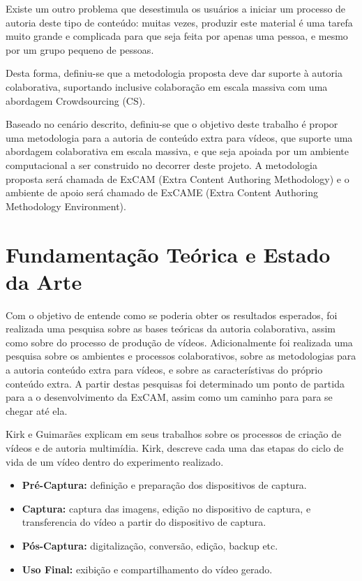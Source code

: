 \documentclass{sig-alternate}
\begin{document}
Existe um outro problema que desestimula os usuários a iniciar um processo de autoria deste tipo de conteúdo: muitas vezes, produzir este material é uma tarefa muito grande e complicada para que seja feita por apenas uma pessoa, e mesmo por um grupo pequeno de pessoas. 

Desta forma, definiu-se que a metodologia proposta deve dar suporte à autoria colaborativa, suportando inclusive colaboração em escala massiva\cite{TEDMassive} com uma abordagem Crowdsourcing (CS).

Baseado no cenário descrito, definiu-se que o objetivo deste trabalho é propor uma metodologia para a autoria de conteúdo extra para vídeos, que suporte uma abordagem colaborativa em escala massiva, e que seja apoiada por um ambiente computacional a ser construido no decorrer deste projeto. A metodologia proposta será chamada de ExCAM (Extra Content Authoring Methodology) e o ambiente de apoio será chamado de ExCAME (Extra Content Authoring Methodology Environment).

\section{Fundamentação Teórica e Estado da Arte}

Com o objetivo de entende como se poderia obter os resultados esperados, foi realizada uma pesquisa sobre as bases teóricas da autoria colaborativa, assim como sobre do processo de produção de vídeos. Adicionalmente foi realizada uma pesquisa sobre os ambientes e processos colaborativos, sobre  as metodologias para a autoria conteúdo extra para vídeos, e sobre as característivas do próprio conteúdo extra.  A partir destas pesquisas foi determinado um ponto de partida para a o desenvolvimento da ExCAM, assim como um caminho para para se chegar até ela.

Kirk\cite{Kirk:2007} e Guimarães\cite{22334} explicam em seus trabalhos sobre os processos de criação de vídeos e de autoria multimídia. Kirk, descreve cada uma das etapas do ciclo de vida de um vídeo dentro do experimento realizado\cite{Kirk:2007}.

\begin{itemize}
\item \textbf{Pré-Captura:}  definição e preparação dos dispositivos de captura.
\item \textbf{Captura:} captura das imagens, edição no dispositivo de captura, e transferencia do vídeo a partir do dispositivo de captura. 
\item \textbf{Pós-Captura:} digitalização, conversão, edição, backup etc.
\item \textbf{Uso Final:} exibição e compartilhamento do vídeo gerado.
\end{itemize}
\end{document}
